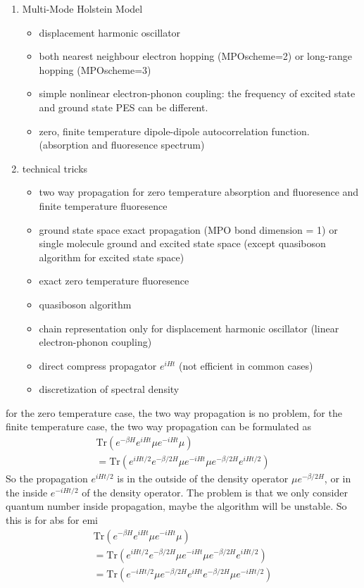 \documentclass[a4paper,11pt]{ctexart}
\begin{document}
\begin{enumerate}
\item Multi-Mode Holstein Model
    \begin{itemize}
        \item displacement harmonic oscillator
        \item both nearest neighbour electron hopping (MPOscheme=2) or long-range hopping
            (MPOscheme=3)
        \item simple nonlinear electron-phonon coupling: the frequency of excited state and ground state PES can be different.
        \item zero, finite temperature dipole-dipole autocorrelation function.
            (absorption and fluoresence spectrum)
    \end{itemize}

\item technical tricks
    \begin{itemize}
        \item two way propagation for zero temperature absorption and
            fluoresence and finite temperature fluoresence
        \item ground state space exact propagation (MPO bond dimension = 1) or
            single molecule ground and excited state space (except quasiboson
            algorithm for excited state space)
        \item exact zero temperature fluoresence
        \item quasiboson algorithm
        \item chain representation only for displacement harmonic oscillator
            (linear electron-phonon coupling)
        \item direct compress propagator $e^{iHt}$ (not efficient in common cases)
        \item discretization of spectral density 
    \end{itemize}

\end{enumerate}

for the zero temperature case, the two way propagation is no problem, 
for the finite temperature case, the two way propagation can be formulated as 
\begin{gather}
   \textrm{Tr} (e^{-\beta H} e^{iHt} \mu e^{-iHt} \mu) \\ 
   = \textrm{Tr} (e^{iHt/2} e^{-\beta/2 H}  \mu e^{-iHt} \mu e^{-\beta/2 H}
   e^{iHt/2})
\end{gather}
So the propagation $e^{iHt/2}$ is in the outside of the density operator $\mu
e^{-\beta/2 H}$, or in the inside $e^{-iHt/2}$ of the density operator.
The problem is that we only consider quantum number inside propagation, maybe
the algorithm will be unstable.
So this is for abs
for emi
\begin{gather}
   \textrm{Tr} (e^{-\beta H} e^{iHt} \mu e^{-iHt} \mu) \\ 
   = \textrm{Tr} (e^{iHt/2} e^{-\beta/2 H}  \mu e^{-iHt} \mu e^{-\beta/2 H}
   e^{iHt/2}) \\
   = \textrm{Tr} (e^{-iHt/2} \mu e^{-\beta/2 H} e^{iHt} e^{-\beta/2 H} \mu 
   e^{-iHt/2})
\end{gather}
\end{document}

